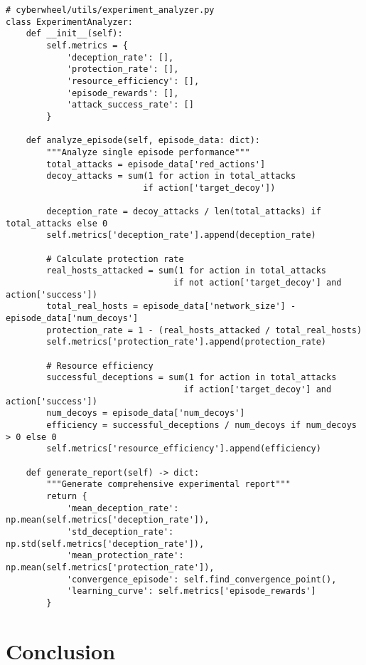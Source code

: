 \documentclass[12pt,a4paper]{article}
\begin{document}
\begin{lstlisting}[caption=Experimental Analysis Implementation]
# cyberwheel/utils/experiment_analyzer.py
class ExperimentAnalyzer:
    def __init__(self):
        self.metrics = {
            'deception_rate': [],
            'protection_rate': [],
            'resource_efficiency': [],
            'episode_rewards': [],
            'attack_success_rate': []
        }
    
    def analyze_episode(self, episode_data: dict):
        """Analyze single episode performance"""
        total_attacks = episode_data['red_actions']
        decoy_attacks = sum(1 for action in total_attacks 
                           if action['target_decoy'])
        
        deception_rate = decoy_attacks / len(total_attacks) if total_attacks else 0
        self.metrics['deception_rate'].append(deception_rate)
        
        # Calculate protection rate
        real_hosts_attacked = sum(1 for action in total_attacks 
                                 if not action['target_decoy'] and action['success'])
        total_real_hosts = episode_data['network_size'] - episode_data['num_decoys']
        protection_rate = 1 - (real_hosts_attacked / total_real_hosts)
        self.metrics['protection_rate'].append(protection_rate)
        
        # Resource efficiency
        successful_deceptions = sum(1 for action in total_attacks 
                                   if action['target_decoy'] and action['success'])
        num_decoys = episode_data['num_decoys']
        efficiency = successful_deceptions / num_decoys if num_decoys > 0 else 0
        self.metrics['resource_efficiency'].append(efficiency)
    
    def generate_report(self) -> dict:
        """Generate comprehensive experimental report"""
        return {
            'mean_deception_rate': np.mean(self.metrics['deception_rate']),
            'std_deception_rate': np.std(self.metrics['deception_rate']),
            'mean_protection_rate': np.mean(self.metrics['protection_rate']),
            'convergence_episode': self.find_convergence_point(),
            'learning_curve': self.metrics['episode_rewards']
        }
\end{lstlisting}

\section{Conclusion}
\end{document}
